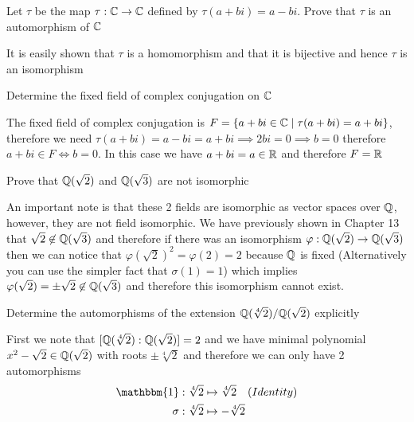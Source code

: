 \begin{exercise}
Let $\tau$ be the map $\tau:\mathbb{C} \to \mathbb{C}$ defined by $\tau(a+bi)=a-bi$. Prove that $\tau$ is an automorphism of $\mathbb{C}$
\end{exercise}
\begin{solution}
    It is easily shown that $\tau$ is a homomorphism and that it is bijective and hence $\tau$ is an isomorphism
\end{solution}

\begin{exercise}
    Determine the fixed field of complex conjugation on $\mathbb{C}$
\end{exercise}
\begin{solution}
    The fixed field of complex conjugation is $F = \{a + bi \in 
    \mathbb{C} \mid \tau(a + bi) = a + bi\}$, therefore we need $\tau(a + bi) = a - bi = a + bi \implies 2bi = 0 \implies b = 0$ therefore $a + bi \in F \iff b = 0$. In this case we have $a + bi = a \in \mathbb{R}$ and therefore $F = \mathbb{R}$ 
\end{solution}

\begin{exercise}
    Prove that $\mathbb{Q}(\sqrt{2})$ and $\mathbb{Q}(\sqrt{3})$ are not isomorphic
\end{exercise}
\begin{solution}
    An important note is that these 2 fields are isomorphic as vector spaces over $\mathbb{Q}$, however, they are not field isomorphic. We have previously shown in Chapter 13 that $\sqrt{2} \not\in \mathbb{Q}(\sqrt{3})$ and therefore if there was an isomorphism $\varphi:\mathbb{Q}(\sqrt{2}) \to \mathbb{Q}(\sqrt{3})$ then we can notice that $\varphi(\sqrt{2})^2 = \varphi(2) = 2$ because $\mathbb{Q}$ is fixed (Alternatively you can use the simpler fact that $\sigma(1) = 1$) which implies $\varphi(\sqrt{2})=\pm\sqrt{2} \not\in \mathbb{Q}(\sqrt{3})$ and therefore this isomorphism cannot exist.
\end{solution}

\begin{exercise}
    Determine the automorphisms of the extension $\mathbb{Q}(\sqrt[4]{2})/\mathbb{Q}(\sqrt{2})$ explicitly
\end{exercise}
\begin{solution}
    First we note that $[\mathbb{Q}(\sqrt[4]{2}):\mathbb{Q}(\sqrt{2})] = 2$ and we have minimal polynomial $x^2 - \sqrt{2} \in \mathbb{Q}(\sqrt{2})$ with roots $\pm\sqrt[4]{2}$ and therefore we can only have 2 automorphisms
    \begin{align*}
        \mathbbm{1}&:\sqrt[4]{2} \mapsto \sqrt[4]{2}\quad(Identity) \\
        \sigma&:\sqrt[4]{2} \mapsto -\sqrt[4]{2}
    \end{align*}
\end{solution}

